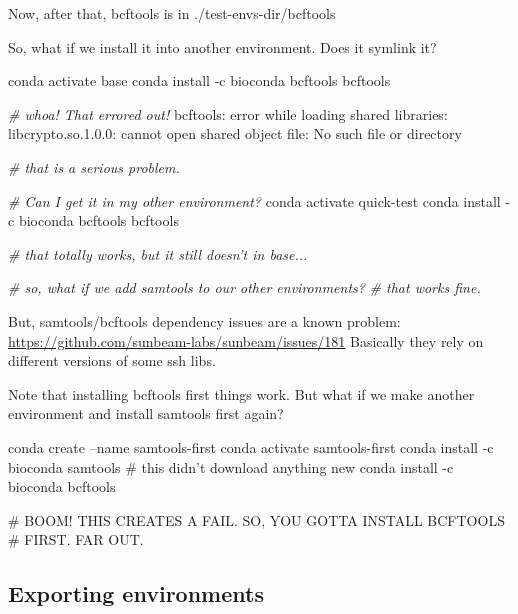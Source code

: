 \documentclass[]{krantz}
\makeatletter
\newenvironment{Shaded}{\begin{snugshade}}{\end{snugshade}}
\newcommand{\CommentTok}[1]{\textcolor[rgb]{0.37,0.37,0.37}{\textit{#1}}}
\newcommand{\ExtensionTok}[1]{#1}
\newcommand{\NormalTok}[1]{#1}
\newcommand{\StringTok}[1]{\textcolor[rgb]{0.5,0.5,0.5}{#1}}
\newenvironment{kframe}{%
\medskip{}
\setlength{\fboxsep}{.8em}
 \def\at@end@of@kframe{}%
 \ifinner\ifhmode%
  \def\at@end@of@kframe{\end{minipage}}%
  \begin{minipage}{\columnwidth}%
 \fi\fi%
 \def\FrameCommand##1{\hskip\@totalleftmargin \hskip-\fboxsep
 \colorbox{shadecolor}{##1}\hskip-\fboxsep
     \hskip-\linewidth \hskip-\@totalleftmargin \hskip\columnwidth}%
 \MakeFramed {\advance\hsize-\width
   \@totalleftmargin\z@ \linewidth\hsize
   \@setminipage}}%
 {\par\unskip\endMakeFramed%
 \at@end@of@kframe}
\renewenvironment{Shaded}{\begin{kframe}}{\end{kframe}}
\makeatother
\begin{document}
Now, after that, bcftools is in ./test-envs-dir/bcftools

So, what if we install it into another environment. Does it symlink it?

\begin{Shaded}
\begin{Highlighting}[]
\ExtensionTok{conda}\NormalTok{ activate base}
\ExtensionTok{conda}\NormalTok{ install -c bioconda bcftools}
\ExtensionTok{bcftools}

\CommentTok{# whoa! That errored out!}
\ExtensionTok{bcftools}\NormalTok{: error while loading shared libraries: libcrypto.so.1.0.0: cannot open shared object file: No such file or directory}

\CommentTok{# that is a serious problem.  }

\CommentTok{# Can I get it in my other environment?}
\ExtensionTok{conda}\NormalTok{ activate quick-test}
\ExtensionTok{conda}\NormalTok{ install -c bioconda bcftools}
\ExtensionTok{bcftools}

\CommentTok{# that totally works, but it still doesn't in base...}

\CommentTok{# so, what if we add samtools to our other environments?}
\CommentTok{# that works fine.}
\end{Highlighting}
\end{Shaded}

But, samtools/bcftools dependency issues are a known problem: \url{https://github.com/sunbeam-labs/sunbeam/issues/181}
Basically they rely on different versions of some ssh libs.

Note that installing bcftools first things work. But what if we make another environment
and install samtools first again?

\begin{Shaded}
\begin{Highlighting}[]
\ExtensionTok{conda}\NormalTok{ create --name samtools-first}
\ExtensionTok{conda}\NormalTok{ activate samtools-first}
\ExtensionTok{conda}\NormalTok{ install -c bioconda samtools  # this didn}\StringTok{'t download anything new}
\StringTok{conda install -c bioconda bcftools}

\StringTok{# BOOM! THIS CREATES A FAIL.  SO, YOU GOTTA INSTALL BCFTOOLS}
\StringTok{# FIRST.  FAR OUT.}
\end{Highlighting}
\end{Shaded}

\hypertarget{exporting-environments}{%
\subsection{Exporting environments}\label{exporting-environments}}
\end{document}
